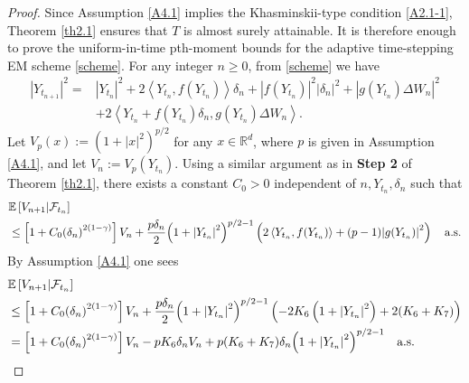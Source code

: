 \documentclass[preprint,12pt,compress]{elsarticle}
\begin{document}
\begin{proof}
Since Assumption \ref{A4.1} implies the Khasminskii-type condition \eqref{A2.1-1}, Theorem  \ref{th2.1} ensures that $T$ is almost surely attainable. It is therefore enough to prove the uniform-in-time pth-moment bounds for the adaptive time-stepping EM scheme \eqref{scheme}. For any integer $n \ge 0$, from \eqref{scheme} we have
\begin{equation*}  
	\begin{split}
		{\left| {{Y_{{t_{n + 1}}}}} \right|^2} =& {\left| {{Y_{{t_n}}}} \right|^2} + 2\left\langle {{Y_{{t_n}}},f({Y_{{t_n}}})} \right\rangle \delta _n  + {\left| {f({Y_{{t_n}}})} \right|^2}{\left| {\delta _n } \right|^2} + {\left| {g({Y_{{t_n}}})\Delta {W_n}} \right|^2} \\
		&+ 2\left\langle {{Y_{{t_n}}} + f({Y_{{t_n}}})\delta _n ,g({Y_{{t_n}}})\Delta {W_n}} \right\rangle .
	\end{split}
\end{equation*}
Let $V_p(x) := {(1 + |x|^2)^{p/2}}$ 
for any $x \in \mathbb{R}^d$, where $p$ is given in Assumption \ref{A4.1}, and let $V_n := V_p(Y_{t_n})$.
Using a similar argument as in \textbf{Step 2} of Theorem \ref{th2.1}, there exists a constant $C_0> 0$ independent of $n, Y_{t_n}, \delta_n$ such that
\begin{equation*}
\begin{split}
	&\mathbb{E}\left[ {V_{n+1}|{{\cal F}_{{t_n}}}} \right] \\
	&\le \left[ {1 + C_0{{\left( {{\delta _n}} \right)}^{2(1 - \gamma )}}} \right]{V_n} + \frac{{p{\delta _n}}}{2}{\left( {1 + {{\left| {{Y_{{t_n}}}} \right|}^2}} \right)^{p/2 - 1}}\left( {2\left\langle {{Y_{{t_n}}},f({Y_{{t_n}}})} \right\rangle  + (p - 1){{\left| {g({Y_{{t_n}}})} \right|}^2}} \right) \quad \text{a.s.}
\end{split}
\end{equation*} 
By Assumption \ref{A4.1} one sees
\begin{equation}  \label{bd1}
\begin{split}
	&\mathbb{E}\left[ {V_{n+1}|{{\cal F}_{{t_n}}}} \right] \\
	&\le \left[ {1 + C_0{{\left( {{\delta _n}} \right)}^{2(1 - \gamma )}}} \right]{V_n} + \frac{{p{\delta _n}}}{2}{\left( {1 + {{\left| {{Y_{{t_n}}}} \right|}^2}} \right)^{p/2 - 1}}\left( { - 2{K_6}\left( {1 + {{\left| {{Y_{{t_n}}}} \right|}^2}} \right) + 2({K_6} + {K_7})} \right) \\
	&= \left[ {1 + C_0{{\left( {{\delta _n}} \right)}^{2(1 - \gamma )}}} \right]{V_n} - p{K_6}{\delta _n}{V_n} + p({K_6} + {K_7}){\delta _n}{\left( {1 + {{\left| {{Y_{{t_n}}}} \right|}^2}} \right)^{p/2 - 1}} \quad \text{a.s.}

\end{split}
\end{equation}
\end{proof}
\end{document}
